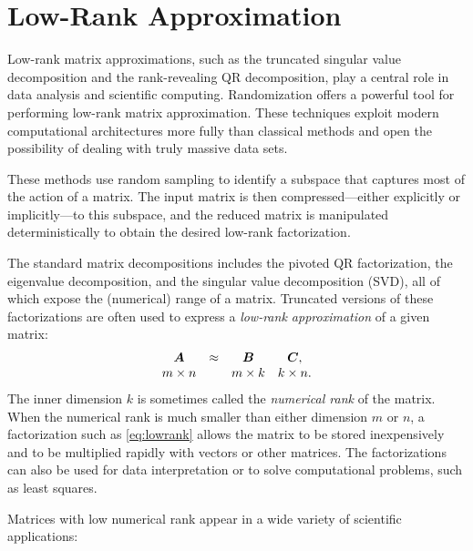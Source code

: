 \documentclass{article}
\begin{document}
\section{Low-Rank Approximation}
\label{sec:low}

Low-rank matrix approximations, such as the truncated singular value
decomposition and the rank-revealing QR decomposition, play a central
role in data analysis and scientific computing. Randomization offers a
powerful tool for performing low-rank matrix approximation.
These
techniques exploit modern computational architectures
more fully than classical methods and open the possibility of
dealing with truly massive data sets.


These methods
use random sampling
to identify a subspace that captures most of the action
of a matrix. The input matrix is then compressed---either explicitly
or implicitly---to this subspace, and the reduced matrix is
manipulated deterministically to obtain the desired low-rank
factorization.

The standard matrix decompositions includes the pivoted QR
factorization, the eigenvalue decomposition, and the singular value
decomposition (SVD), all of which expose the (numerical) range of a
matrix. Truncated versions of these factorizations are often used to
express a \emph{low-rank approximation} of a given matrix:
\begin{equation}
\label{eq:lowrank}
\begin{array}{ccccccccccc}
\bm{A} &\approx& \bm{B} & \bm{C},\\
m\times n && m \times k & k\times n.
\end{array}
\end{equation}
The inner dimension $k$ is sometimes called the \emph{numerical rank} of the matrix.
When the numerical rank is much smaller than either dimension $m$ or $n$,
a factorization such as \eqref{eq:lowrank} allows the matrix to be stored
inexpensively and to be multiplied rapidly with vectors or other matrices.
The factorizations can also be used for data interpretation or to
solve computational problems, such as least squares.

Matrices with low numerical rank appear in a wide variety of scientific
applications:

\end{document}
